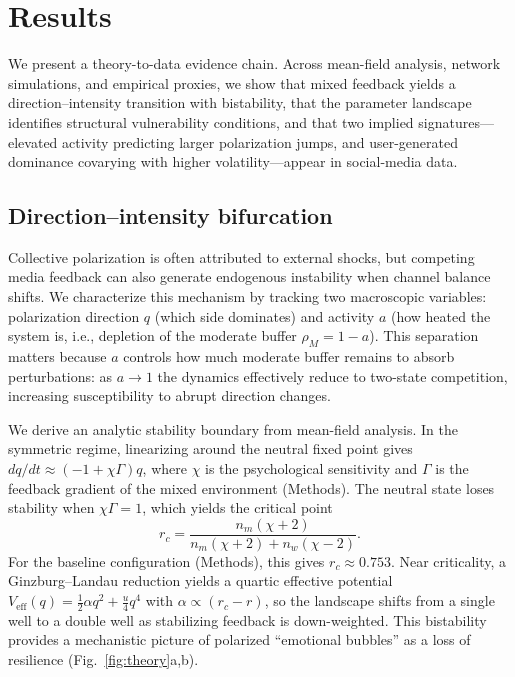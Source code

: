 \documentclass[preprint,12pt]{elsarticle}
\begin{document}
\section{Results}
\label{sec:results}
\noindent We present a theory-to-data evidence chain. Across mean-field analysis, network simulations, and empirical proxies, we show that mixed feedback yields a direction--intensity transition with bistability, that the parameter landscape identifies structural vulnerability conditions, and that two implied signatures---elevated activity predicting larger polarization jumps, and user-generated dominance covarying with higher volatility---appear in social-media data.

\subsection{Direction--intensity bifurcation}
\label{sec:direction-intensity-bifurcation}
Collective polarization is often attributed to external shocks, but competing media feedback can also generate endogenous instability when channel balance shifts. We characterize this mechanism by tracking two macroscopic variables: polarization direction $q$ (which side dominates) and activity $a$ (how heated the system is, i.e., depletion of the moderate buffer $\rho_M=1-a$). This separation matters because $a$ controls how much moderate buffer remains to absorb perturbations: as $a\to 1$ the dynamics effectively reduce to two-state competition, increasing susceptibility to abrupt direction changes.

We derive an analytic stability boundary from mean-field analysis. In the symmetric regime, linearizing around the neutral fixed point gives $dq/dt\approx(-1+\chi\Gamma)q$, where $\chi$ is the psychological sensitivity and $\Gamma$ is the feedback gradient of the mixed environment (Methods). The neutral state loses stability when $\chi\Gamma=1$, which yields the critical point
\begin{equation}
r_c=\frac{n_m(\chi+2)}{n_m(\chi+2)+n_w(\chi-2)}.
\label{eq:rc}
\end{equation}
For the baseline configuration (Methods), this gives $r_c\approx 0.753$. Near criticality, a Ginzburg--Landau reduction yields a quartic effective potential $V_{\text{eff}}(q)=\tfrac{1}{2}\alpha q^2+\tfrac{u}{4}q^4$ with $\alpha\propto(r_c-r)$, so the landscape shifts from a single well to a double well as stabilizing feedback is down-weighted. This bistability provides a mechanistic picture of polarized ``emotional bubbles'' as a loss of resilience (Fig.~\ref{fig:theory}a,b).
\end{document}
